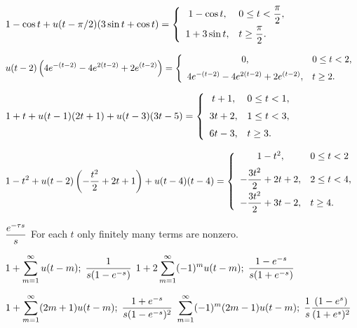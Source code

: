  $\displaystyle{1-\cos t+u(t-\pi/2)(3\sin t+\cos t)}=
\displaystyle{\left\{\begin{array}{cl}1-\cos t,&0\le t<\displaystyle\frac{\pi}{2},\\[2\jot]1+3\sin t,&t\ge\displaystyle\frac{\pi}{2}.\end{array}\right.}$

 $\displaystyle{u(t-2)\left
(4e^{-(t-2)}-4e^{2(t-2)}+2e^{(t-2)}\right)}=
\displaystyle{\left\{\begin{array}{cl} 0,&0\le
t<2,\\[2\jot]4e^{-(t-2)}-4e^{2(t-2)}+2e^{(t-2)},&t\ge
2.\end{array}\right.}$

 $\displaystyle{1+t+u(t-1)(2t+1)+u(t-3)(3t-5)}=\displaystyle{
\left\{\begin{array}{cl}t+1,&0\le t<1,\\[2\jot]3t+2,&1\le
t<3,\\[2\jot]6t-3,&t\ge3.\end{array}\right.}$

$\displaystyle{1-t^{2}+u(t-2)\left(-\frac{t^{2}}{2}+2t+1\right)+u(t-4)(t-4)}=
\displaystyle{\left\{\begin{array}{cl}1-t^{2},&0\le
t<2\\[2\jot]-\displaystyle\frac{3t^{2}}{2}+2t+2,&2\le
t<4,\\[2\jot]-\displaystyle\frac{3t^{2}}{2}+3t-2,&t\ge4.\end{array}\right.}$

 $\displaystyle\frac{e^{-\tau s}}{s}$
 {\rm For each $t$ only finitely many terms are
nonzero.}

 $\displaystyle{1+\sum_{m=1}^{\infty}u(t-m);\;
\frac{1}{s(1-e^{-s})}}$
 $\displaystyle{1+2\sum_{m=1}^{\infty}(-1)^{m}u(t-m);\;
\frac{1-e^{-s}}{s(1+e^{-s})}}$

 $\displaystyle{1+\sum_{m=1}^{\infty}(2m+1)u(t-m);\;
\frac{1+e^{-s}}{s(1-e^{-s})^{2}}}$
$\displaystyle{\sum_{m=1}^{\infty}(-1)^{m}(2m-1)u(t-m);\;\frac{1}{s}\frac{(1-e^{s})}{(1+e^{s})^{2}}}$

